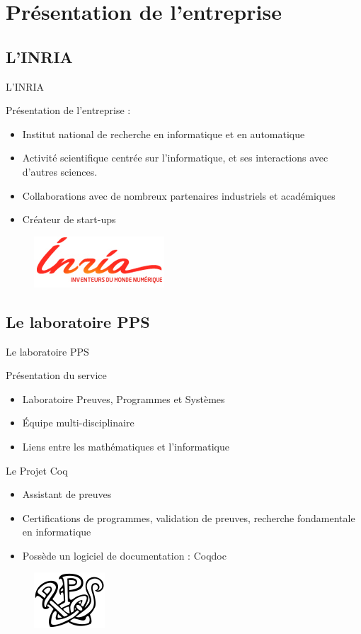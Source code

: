 \documentclass[compress]{beamer}
\newenvironment{tframe}[1]{
  \subsection{#1}
  \begin{frame}{#1}
  }{
  \end{frame}
  }
\begin{document}
\section{Présentation de l'entreprise}
\begin{tframe}{L'INRIA}
  Présentation de l'entreprise :
  \begin{itemize}
    \item Institut national de recherche en informatique et en automatique
    \item Activité scientifique centrée sur l'informatique, et ses interactions
      avec d'autres sciences.
    \item Collaborations avec de nombreux partenaires industriels et académiques
    \item Créateur de start-ups
  \end{itemize}
  \begin{figure}
        \includegraphics[scale=0.4]{../data/inria.jpg}
  \end{figure}
\end{tframe}
\begin{tframe}{Le laboratoire PPS}
  Présentation du service
  \begin{itemize}
    \item Laboratoire Preuves, Programmes et Systèmes
    \item Équipe multi-disciplinaire
    \item Liens entre les mathématiques et l'informatique
  \end{itemize}

  \medskip

  Le Projet Coq
  \begin{itemize}
    \item Assistant de preuves
    \item Certifications de programmes, validation de preuves, recherche
      fondamentale en informatique
    \item Possède un logiciel de documentation : Coqdoc
  \end{itemize}
  \begin{figure}
        \includegraphics[scale=0.6]{../data/pps.png}
  \end{figure}
\end{tframe}
\end{document}

